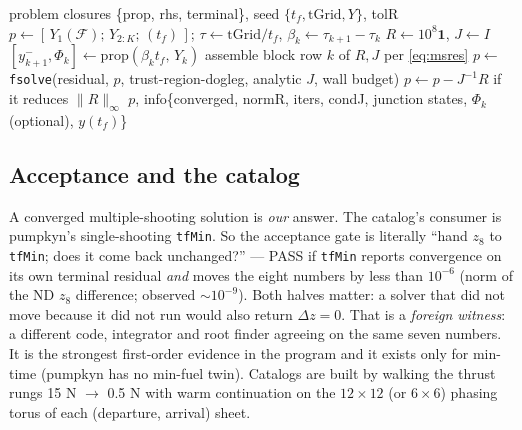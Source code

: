 \documentclass[11pt]{article}
\newcommand{\tf}{t_f}\newcommand{\R}{\mathbb{R}}
\newcommand{\file}[1]{\texttt{#1}}
\begin{document}
\begin{algorithm}[h]
\caption{\texttt{ms\_bvp}: generic multiple shooting (min-time and fixed-$\tf$)}
\begin{algorithmic}[1]
\Require problem closures \{prop, rhs, terminal\}, seed $\{\tf,\mathrm{tGrid},Y\}$, tolR
\State $p\gets[\,Y_1(\mathcal F);\,Y_{2:K};\,(\tf)\,]$; $\tau\gets\mathrm{tGrid}/\tf$, $\beta_k\gets\tau_{k+1}-\tau_k$
   \Return $R\gets 10^8\mathbf 1$, $J\gets I$ \EndIf
   $[y^-_{k+1},\Phi_k]\gets\mathrm{prop}(\beta_k\tf,\,Y_k)$ 
    \State assemble block row $k$ of $R,J$ per \eqref{eq:msres}
  \EndFor
\EndFunction
\State $p\gets$ \texttt{fsolve}(residual, $p$, trust-region-dogleg, analytic $J$, wall budget)
 $p\gets p-J^{-1}R$ if it reduces $\|R\|_\infty$ \EndWhile
\State \Return $p$, info\{converged, normR, iters, condJ, junction states, $\Phi_k$ (optional), $y(\tf)$\}
\end{algorithmic}
\end{algorithm}

\subsection{Acceptance and the catalog}
\begin{intu}
A converged multiple-shooting solution is \emph{our} answer. The catalog's
consumer is pumpkyn's single-shooting \file{tfMin}. So the acceptance gate
is literally ``hand $z_8$ to \file{tfMin}; does it come back unchanged?'' --- PASS if \file{tfMin} reports convergence on its own terminal residual \emph{and} moves the eight numbers by less than $10^{-6}$ (norm of the ND $z_8$ difference; observed $\sim10^{-9}$). Both halves matter: a solver that did not move because it did not run would also return $\Delta z=0$. That is a
\emph{foreign witness}: a different code, integrator and root finder agreeing
on the same seven numbers. It is the strongest first-order evidence in the
program and it exists only for min-time (pumpkyn has no min-fuel twin).
Catalogs are built by walking the thrust rungs 15 N $\to$ 0.5 N with warm
continuation on the $12\times12$ (or $6\times6$) phasing torus of each
(departure, arrival) sheet.
\end{intu}
\end{document}
